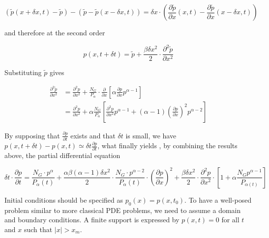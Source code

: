 \[
\left(\tilde{p}(x+\delta x,t) - \tilde{p}\right) - \left(\tilde{p} - \tilde{p}(x-\delta x,t)\right) = \delta x \cdot \left(\frac{\partial \tilde{p}}{\partial{x}}(x,t) - \frac{\partial \tilde{p}}{\partial{x}}(x - \delta x,t)\right)
\]

and therefore at the second order

\[
p(x,t+\delta t) = \tilde{p} + \frac{\beta \delta x^2}{2} \cdot \frac{\partial^2 \tilde{p}}{\partial x^2}
\]

Substituting $\tilde{p}$ gives

\[
\begin{split}
\frac{\partial^2 \tilde{p}}{\partial x^2} & = \frac{\partial^2 p}{\partial x^2} + \frac{N_G}{P_\alpha}\cdot \frac{\partial}{\partial x}\left[\alpha \frac{\partial p}{\partial x} p^{\alpha - 1}\right]\\
& = \frac{\partial^2 p}{\partial x^2} + \alpha \frac{N_G}{P_\alpha} \left[\frac{\partial^2 p}{\partial x^2} p^{\alpha - 1} + (\alpha - 1) \left( \frac{\partial p}{\partial x}\right)^2 p^{\alpha - 2}\right]
\end{split}
\]

By supposing that $\frac{\partial p}{\partial t}$ exists and that $\delta t$ is small, we have $p(x,t+\delta t) - p(x,t) \simeq \delta t\frac{\partial p}{\partial t}$, what finally yields , by combining the results above, the partial differential equation


\begin{equation}\label{eq:pde}
\delta t \cdot \frac{\partial p}{\partial t} = \frac{N_G \cdot p^{\alpha}}{P_{\alpha}(t)} + \frac{\alpha \beta (\alpha - 1) \delta x^2}{2}\cdot \frac{N_G \cdot p^{\alpha-2}}{P_{\alpha}(t)} \cdot \left(\frac{\partial p}{\partial x}\right)^2 + \frac{\beta \delta x^2}{2} \cdot \frac{\partial^2 p}{\partial x^2} \cdot\left[ 1 + \alpha \frac{N_G p^{\alpha - 1}}{P_{\alpha(t)}} \right]
\end{equation}



Initial conditions should be specified as $p_0(x) = p(x,t_0)$. To have a well-posed problem similar to more classical PDE problems, we need to assume a domain and boundary conditions. A finite support is expressed by $p(x,t)=0$ for all $t$ and $x$ such that $\left|x\right|>x_m$.



